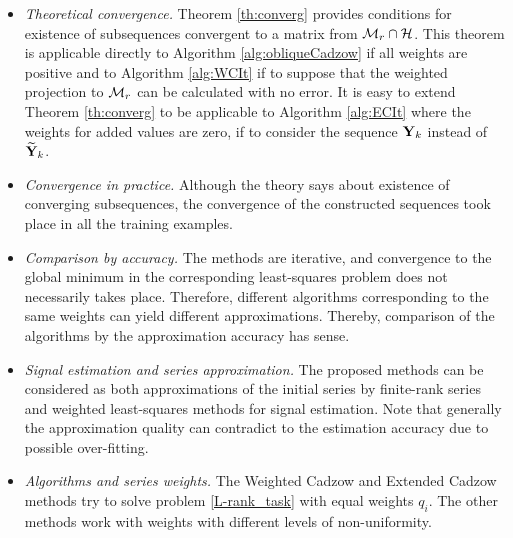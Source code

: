\documentclass[sii]{ipart}
\begin{document}
	\begin{itemize}
		\item \textit{Theoretical convergence.}
		Theorem \ref{th:converg} provides conditions for existence of subsequences convergent to a matrix from $\mathcal{M}_r \cap \mathcal{H}$. This theorem is applicable directly to Algorithm \ref{alg:obliqueCadzow} if all weights are positive and to Algorithm \ref{alg:WCIt} if to suppose that the weighted projection to $\mathcal{M}_r$ can be calculated with no error. It is easy to extend Theorem \ref{th:converg} to be applicable to Algorithm \ref{alg:ECIt} where the weights for added values are zero, if to consider the sequence  $\mathbf{Y}_k$ instead of $\widetilde{\mathbf{Y}}_k$. 
		\item \textit{Convergence in practice.} Although the theory says about existence of converging subsequences, the convergence of the constructed sequences took place in all the training examples.
		\item \textit{Comparison by accuracy.}
		The methods are iterative, and convergence to the global minimum in the corresponding least-squares problem does not necessarily takes place. Therefore, different algorithms corresponding to the same weights can yield different approximations. Thereby, comparison of the algorithms by the approximation accuracy has sense.		
\item \textit{Signal estimation and series approximation.}
		The proposed methods can be considered as both approximations of the initial series by finite-rank series and weighted least-squares methods for signal estimation. Note that generally the approximation quality can contradict to the estimation accuracy due to possible over-fitting.
		\item \textit{Algorithms and series weights.}
		The Weighted Cadzow and Extended Cadzow methods try to solve problem \eqref{L-rank_task} with equal weights $q_i$. The other methods work with weights with different levels of non-uniformity.

\end{itemize}
\end{document}
